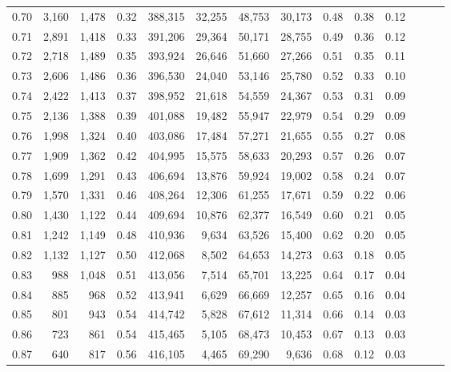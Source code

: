 \begin{tabular}{rrrrrrrrrrrrrr}
0.70 &   3,160 &  1,478 &  0.32 &  388,315 &   32,255 &  48,753 &  30,173 &  0.48 &  0.38 &      0.12 \\
0.71 &   2,891 &  1,418 &  0.33 &  391,206 &   29,364 &  50,171 &  28,755 &  0.49 &  0.36 &      0.12 \\
0.72 &   2,718 &  1,489 &  0.35 &  393,924 &   26,646 &  51,660 &  27,266 &  0.51 &  0.35 &      0.11 \\
0.73 &   2,606 &  1,486 &  0.36 &  396,530 &   24,040 &  53,146 &  25,780 &  0.52 &  0.33 &      0.10 \\
0.74 &   2,422 &  1,413 &  0.37 &  398,952 &   21,618 &  54,559 &  24,367 &  0.53 &  0.31 &      0.09 \\
0.75 &   2,136 &  1,388 &  0.39 &  401,088 &   19,482 &  55,947 &  22,979 &  0.54 &  0.29 &      0.09 \\
0.76 &   1,998 &  1,324 &  0.40 &  403,086 &   17,484 &  57,271 &  21,655 &  0.55 &  0.27 &      0.08 \\
0.77 &   1,909 &  1,362 &  0.42 &  404,995 &   15,575 &  58,633 &  20,293 &  0.57 &  0.26 &      0.07 \\
0.78 &   1,699 &  1,291 &  0.43 &  406,694 &   13,876 &  59,924 &  19,002 &  0.58 &  0.24 &      0.07 \\
0.79 &   1,570 &  1,331 &  0.46 &  408,264 &   12,306 &  61,255 &  17,671 &  0.59 &  0.22 &      0.06 \\
0.80 &   1,430 &  1,122 &  0.44 &  409,694 &   10,876 &  62,377 &  16,549 &  0.60 &  0.21 &      0.05 \\
0.81 &   1,242 &  1,149 &  0.48 &  410,936 &    9,634 &  63,526 &  15,400 &  0.62 &  0.20 &      0.05 \\
0.82 &   1,132 &  1,127 &  0.50 &  412,068 &    8,502 &  64,653 &  14,273 &  0.63 &  0.18 &      0.05 \\
0.83 &     988 &  1,048 &  0.51 &  413,056 &    7,514 &  65,701 &  13,225 &  0.64 &  0.17 &      0.04 \\
0.84 &     885 &    968 &  0.52 &  413,941 &    6,629 &  66,669 &  12,257 &  0.65 &  0.16 &      0.04 \\
0.85 &     801 &    943 &  0.54 &  414,742 &    5,828 &  67,612 &  11,314 &  0.66 &  0.14 &      0.03 \\
0.86 &     723 &    861 &  0.54 &  415,465 &    5,105 &  68,473 &  10,453 &  0.67 &  0.13 &      0.03 \\
0.87 &     640 &    817 &  0.56 &  416,105 &    4,465 &  69,290 &   9,636 &  0.68 &  0.12 &      0.03 \\

\end{tabular}
